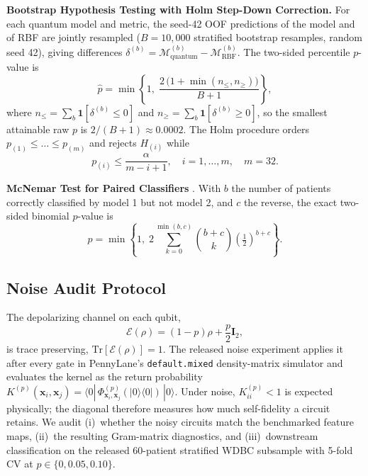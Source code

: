 \documentclass[journal,twocolumn]{IEEEtran}
\begin{document}
\textbf{Bootstrap Hypothesis Testing with Holm Step-Down Correction.} For each quantum model and metric, the seed-42 OOF predictions of the model and of RBF are jointly resampled ($B=10{,}000$ stratified bootstrap resamples, random seed 42), giving differences $\delta^{(b)} = \mathcal{M}^{(b)}_{\text{quantum}} - \mathcal{M}^{(b)}_{\text{RBF}}$. The two-sided percentile $p$-value is
\begin{equation}
    \hat{p} = \min\!\left\{1,\; \frac{2\,\bigl(1 + \min(n_{\le}, n_{\ge})\bigr)}{B + 1}\right\},
    \label{eq:bootstrap_p}
\end{equation}
where $n_{\le} = \sum_{b} \mathbf{1}[\delta^{(b)} \le 0]$ and $n_{\ge} = \sum_{b} \mathbf{1}[\delta^{(b)} \ge 0]$, so the smallest attainable raw $p$ is $2/(B+1) \approx 0.0002$. The Holm procedure orders $p_{(1)} \le \dots \le p_{(m)}$ and rejects $H_{(i)}$ while
\begin{equation}
    p_{(i)} \le \frac{\alpha}{m - i + 1}, \quad i = 1, \dots, m, \quad m=32.
    \label{eq:holm}
\end{equation}

\textbf{McNemar Test for Paired Classifiers} \cite{mcnemar1947note}. With $b$ the number of patients correctly classified by model 1 but not model 2, and $c$ the reverse, the exact two-sided binomial $p$-value is
\begin{equation}
    p = \min\!\left\{1,\; 2 \sum_{k=0}^{\min(b,c)} \binom{b+c}{k} \left(\tfrac{1}{2}\right)^{b+c}\right\}.
    \label{eq:mcnemar_exact}
\end{equation}

\subsection{Noise Audit Protocol}

The depolarizing channel on each qubit,
\begin{equation}
    \mathcal{E}(\rho) = (1 - p)\rho + \frac{p}{2}\mathbf{I}_{2},
    \label{eq:depolchannel}
\end{equation}
is trace preserving, $\text{Tr}[\mathcal{E}(\rho)] = 1$. The released noise experiment applies it after every gate in PennyLane's \texttt{default.mixed} density-matrix simulator and evaluates the kernel as the return probability $K^{(p)}(\mathbf{x}_i,\mathbf{x}_j) = \langle 0|\,\Phi^{(p)}_{\mathbf{x}_i,\mathbf{x}_j}(|0\rangle\langle 0|)\,|0\rangle$. Under noise, $K^{(p)}_{ii} < 1$ is expected physically; the diagonal therefore measures how much self-fidelity a circuit retains. We audit (i)~whether the noisy circuits match the benchmarked feature maps, (ii)~the resulting Gram-matrix diagnostics, and (iii)~downstream classification on the released 60-patient stratified WDBC subsample with 5-fold CV at $p\in\{0, 0.05, 0.10\}$.
\end{document}
